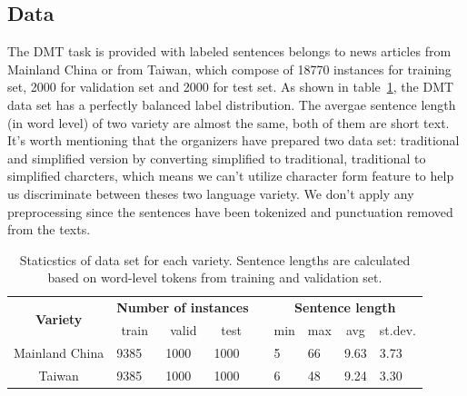 \documentclass[11pt,a4paper]{article}
\begin{document}
\subsection{Data\label{data}}
The DMT task is provided with labeled sentences belongs to news articles from Mainland China or from Taiwan, which compose of 18770 instances for training set, 2000 for validation set and 2000 for test set. As shown in table~\ref{data staticstics},  the DMT data set has a perfectly balanced label distribution. The avergae sentence length (in word level) of two variety are almost the same, both of them are short text. It's worth mentioning that the organizers have prepared two data set: traditional and simplified version by converting simplified to traditional, traditional to simplified charcters, which means we can't utilize character form feature to help us discriminate between theses two language variety.  We don't apply any preprocessing since the sentences have been tokenized and punctuation removed from the texts.

\begin{table}[]
\centering
\begin{tabular}{cllllllll}
\hline
\multirow{2}{*}{\textbf{Variety}} & \multicolumn{3}{c}{\textbf{Number of instances}} &                      & \multicolumn{4}{c}{\textbf{Sentence length}}                                                              \\ \cline{2-4} \cline{6-9} 
                                  & \multicolumn{1}{c}{train} & \multicolumn{1}{c}{valid} & \multicolumn{1}{c}{test} & \multicolumn{1}{c}{} & \multicolumn{1}{c}{min} & \multicolumn{1}{c}{max} & \multicolumn{1}{c}{avg} & \multicolumn{1}{c}{st.dev.} \\ \hline
Mainland China   & 9385    & 1000     & 1000      &          & 5         & 66       & 9.63        & 3.73     \\
Taiwan                 & 9385    & 1000     & 1000      &          & 6         & 48       & 9.24        & 3.30     \\ \hline
\end{tabular}
\caption{Staticstics of data set for each variety. Sentence lengths are calculated based on word-level tokens from training and validation set.}
\label{data staticstics}
\end{table}
\end{document}
